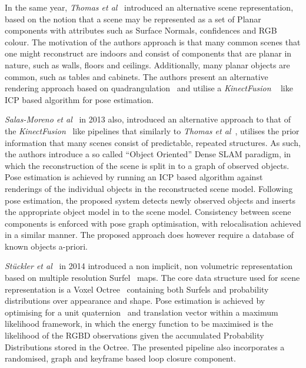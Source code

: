 In the same year, \textit{Thomas et al}~\cite{Thomas2013} introduced an alternative scene 
representation, based on the notion that a scene may be represented as a set of Planar 
components with attributes such as Surface Normals, confidences and RGB colour. The motivation 
of the authors approach is that many common scenes that one might reconstruct are indoors and 
consist of components that are planar in nature, such as walls, floors and ceilings. Additionally, 
many planar objects are common, such as tables and cabinets. The authors present an alternative 
rendering approach based on quadrangulation~\cite{Dong2006} and utilise a \textit{KinectFusion} 
~\cite{Newcombe2011} like ICP based algorithm for pose estimation.

\textit{Salas-Moreno et al}~\cite{Salas-Moreno2013} in 2013 also, introduced an alternative 
approach to that of the \textit{KinectFusion}~\cite{Newcombe2011} like pipelines that similarly to 
\textit{Thomas et al}~\cite{Thomas2013}, utilises the prior information that many scenes consist 
of predictable, repeated structures. As such, the authors introduce a so called ``Object Oriented'' 
Dense SLAM paradigm, in which the reconstruction of the scene is split in to a graph of observed 
objects. Pose estimation is achieved by running an ICP based algorithm against renderings of the 
individual objects in the reconstructed scene model. Following pose estimation, the proposed 
system detects newly observed objects and inserts the appropriate object model in to the scene 
model. Consistency between scene components is enforced with pose graph optimisation, with 
relocalisation achieved in a similar manner. The proposed approach does however require a 
database of known objects a-priori.

\textit{St{\"u}ckler et al}~\cite{Stuckler2014} in 2014 introduced a non implicit, non volumetric 
representation based on multiple resolution Surfel~\cite{Pfister2000} maps. The core data structure 
used for scene representation is a Voxel Octree~\cite{Laine2010} containing both Surfels and 
probability distributions over appearance and shape. Pose estimation is achieved by optimising for 
a unit quaternion~\cite{Mukundan2002} and translation vector within a maximum likelihood framework, 
in which the energy function to be maximised is the likelihood of the RGBD observations given the 
accumulated Probability Distributions stored in the Octree. The presented pipeline also incorporates 
a randomised, graph and keyframe based loop closure component.


